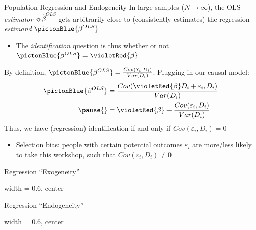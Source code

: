 \documentclass{beamer}
\begin{document}
\begin{frame}{Population Regression and Endogeneity}
In large samples ($N\rightarrow\infty$), the OLS \emph{estimator} $\sun{\widehat{\beta}^{OLS}}$ gets arbitrarily close to (consistently estimates) the regression \emph{estimand} $\pictonBlue{\beta^{OLS}}$\pause
\begin{itemize} 
\item The \emph{identification} question is thus whether or not $\pictonBlue{\beta^{OLS}}=\violetRed{\beta}$
\end{itemize}\medskip\pause{}
By definition, $\pictonBlue{\beta^{OLS}}=\frac{Cov(Y_i,D_i)}{Var(D_i)}$.\pause{} Plugging in our causal model:
\begin{align*}
\pictonBlue{\beta^{OLS}} &= \frac{Cov( \violetRed{\beta} D_i + \varepsilon_i,D_i)}{Var(D_i)}\\ \pause{}
&=\violetRed{\beta} + \frac{Cov(\varepsilon_i,D_i)}{Var(D_i)}
\end{align*}\pause{}
Thus, we have (regression) identification if and only if $Cov(\varepsilon_i,D_i)=0$\smallskip
\begin{itemize}\pause{}
\item Selection bias: people with certain potential outcomes $\varepsilon_i$ are more/less likely to take this workshop, such that $Cov(\varepsilon_i,D_i)\neq 0$
\end{itemize}
\end{frame}

\begin{frame}{Regression ``Exogeneity''}
  \begin{adjustbox}{width = 0.6\textwidth, center}
  \end{adjustbox}
\end{frame}

\begin{frame}{Regression ``Endogeneity''}
  \begin{adjustbox}{width = 0.6\textwidth, center}
  \end{adjustbox}
\end{frame}
\end{document}

